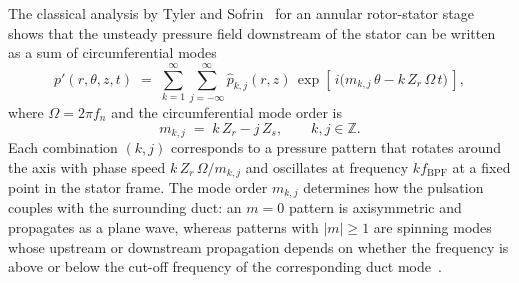 The classical analysis by Tyler and Sofrin~\cite{Tyler1962} for an annular rotor-stator stage shows that the unsteady pressure field downstream of the stator can be written as a sum of circumferential modes
\begin{equation}
    p'(r,\theta,z,t) \;=\; \sum_{k=1}^{\infty}\sum_{j=-\infty}^{\infty}
      \hat{p}_{k,j}(r,z)\,
      \exp\!\left[\, i\bigl(m_{k,j}\,\theta - k\,Z_r\,\Omega\,t\bigr)\,\right],
    \label{eq:tyler_sofrin_expansion}
\end{equation}
where $\Omega = 2\pi f_n$ and the circumferential mode order is
\begin{equation}
    m_{k,j} \;=\; k\,Z_r - j\,Z_s, \qquad k,j \in \mathbb{Z}.
    \label{eq:tyler_sofrin}
\end{equation}
Each combination $(k,j)$ corresponds to a pressure pattern that rotates around the axis with phase speed $k\,Z_r\,\Omega/m_{k,j}$ and oscillates at frequency $k f_{\mathrm{BPF}}$ at a fixed point in the stator frame. The mode order $m_{k,j}$ determines how the pulsation couples with the surrounding duct: an $m=0$ pattern is axisymmetric and propagates as a plane wave, whereas patterns with $|m|\geq 1$ are spinning modes whose upstream or downstream propagation depends on whether the frequency is above or below the cut-off frequency of the corresponding duct mode~\cite{Morse1968}.
 
